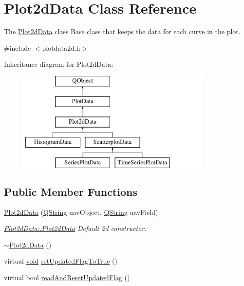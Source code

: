 \hypertarget{class_plot2d_data}{\section{Plot2d\-Data Class Reference}
\label{class_plot2d_data}
}


The \hyperlink{class_plot2d_data}{Plot2d\-Data} class Base class that keeps the data for each curve in the plot.  




{\ttfamily \#include $<$plotdata2d.\-h$>$}

Inheritance diagram for Plot2d\-Data\-:\begin{figure}[H]
\begin{center}
\leavevmode
\includegraphics[height=5.000000cm]{class_plot2d_data}
\end{center}
\end{figure}
\subsection*{Public Member Functions}
\begin{DoxyCompactItemize}
\item 
\hyperlink{group___scope_plugin_ga47355d48ebe2a3f10f3eeb8c885d91d2}{Plot2d\-Data} (\hyperlink{group___u_a_v_objects_plugin_gab9d252f49c333c94a72f97ce3105a32d}{Q\-String} uav\-Object, \hyperlink{group___u_a_v_objects_plugin_gab9d252f49c333c94a72f97ce3105a32d}{Q\-String} uav\-Field)
\begin{DoxyCompactList}\small\item\em \hyperlink{group___scope_plugin_ga47355d48ebe2a3f10f3eeb8c885d91d2}{Plot2d\-Data\-::\-Plot2d\-Data} Default 2d constructor. \end{DoxyCompactList}\item 
\hyperlink{group___scope_plugin_ga7e60665e7c88b1df55cfefe356d8ee27}{$\sim$\-Plot2d\-Data} ()
\item 
virtual \hyperlink{group___u_a_v_objects_plugin_ga444cf2ff3f0ecbe028adce838d373f5c}{void} \hyperlink{group___scope_plugin_ga8cf81c5a6f87fc1c97b0054f2cb23f90}{set\-Updated\-Flag\-To\-True} ()
\item 
virtual bool \hyperlink{group___scope_plugin_ga5fe24bb29fc32dfa2f955383dc96877e}{read\-And\-Reset\-Updated\-Flag} ()
\end{DoxyCompactItemize}
